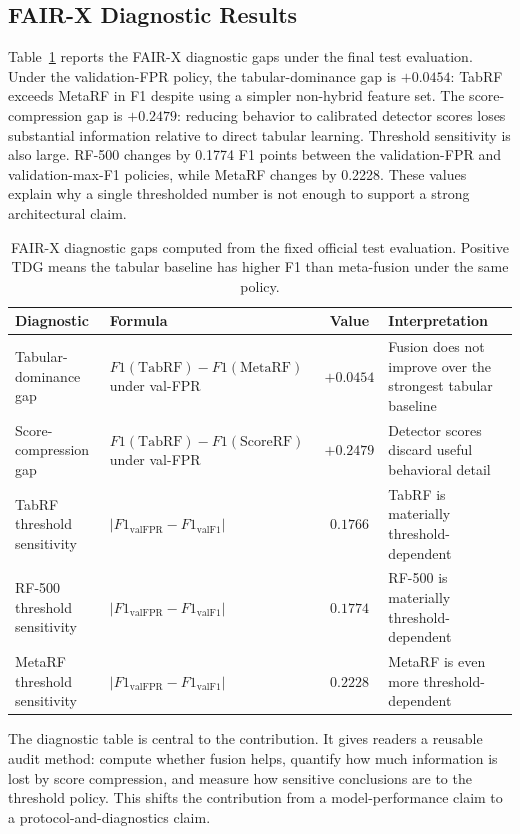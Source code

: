 \documentclass[10pt,journal,compsoc]{IEEEtran}
\begin{document}
\subsection{FAIR-X Diagnostic Results}

Table~\ref{tab:diagnostics} reports the FAIR-X diagnostic gaps under the final test evaluation. Under the validation-FPR policy, the tabular-dominance gap is $+0.0454$: TabRF exceeds MetaRF in F1 despite using a simpler non-hybrid feature set. The score-compression gap is $+0.2479$: reducing behavior to calibrated detector scores loses substantial information relative to direct tabular learning. Threshold sensitivity is also large. RF-500 changes by 0.1774 F1 points between the validation-FPR and validation-max-F1 policies, while MetaRF changes by 0.2228. These values explain why a single thresholded number is not enough to support a strong architectural claim.

\begin{table}[t]
\centering
\caption{FAIR-X diagnostic gaps computed from the fixed official test evaluation. Positive TDG means the tabular baseline has higher F1 than meta-fusion under the same policy.}
\label{tab:diagnostics}
\small
\begin{tabular}{p{3.2cm}p{5.0cm}cp{5.2cm}}
\toprule
\textbf{Diagnostic} & \textbf{Formula} & \textbf{Value} & \textbf{Interpretation} \\
\midrule
Tabular-dominance gap & $F1(\mathrm{TabRF})-F1(\mathrm{MetaRF})$ under val-FPR & $+0.0454$ & Fusion does not improve over the strongest tabular baseline \\
Score-compression gap & $F1(\mathrm{TabRF})-F1(\mathrm{ScoreRF})$ under val-FPR & $+0.2479$ & Detector scores discard useful behavioral detail \\
TabRF threshold sensitivity & $|F1_{\mathrm{valFPR}}-F1_{\mathrm{valF1}}|$ & $0.1766$ & TabRF is materially threshold-dependent \\
RF-500 threshold sensitivity & $|F1_{\mathrm{valFPR}}-F1_{\mathrm{valF1}}|$ & $0.1774$ & RF-500 is materially threshold-dependent \\
MetaRF threshold sensitivity & $|F1_{\mathrm{valFPR}}-F1_{\mathrm{valF1}}|$ & $0.2228$ & MetaRF is even more threshold-dependent \\
\bottomrule
\end{tabular}
\end{table}

The diagnostic table is central to the contribution. It gives readers a reusable audit method: compute whether fusion helps, quantify how much information is lost by score compression, and measure how sensitive conclusions are to the threshold policy. This shifts the contribution from a model-performance claim to a protocol-and-diagnostics claim.
\end{document}
